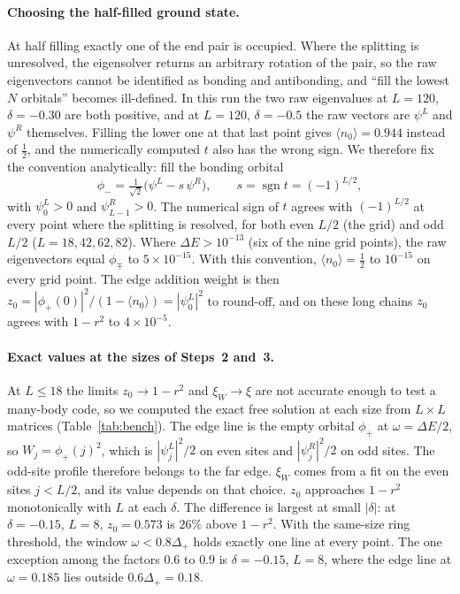 \documentclass[11pt,a4paper]{article}
\begin{document}
\paragraph{Choosing the half-filled ground state.}
At half filling exactly one of the end pair is occupied.
Where the splitting is unresolved, the eigensolver returns an arbitrary rotation of the pair, so the raw eigenvectors cannot be identified as bonding and antibonding, and ``fill the lowest $N$ orbitals'' becomes ill-defined.
In this run the two raw eigenvalues at $L=120$, $\delta=-0.30$ are both positive, and at $L=120$, $\delta=-0.5$ the raw vectors are $\psi^L$ and $\psi^R$ themselves.
Filling the lower one at that last point gives $\langle n_0\rangle = 0.944$ instead of $\tfrac12$, and the numerically computed $t$ also has the wrong sign.
We therefore fix the convention analytically: fill the bonding orbital
\begin{equation}
  \phi_- = \tfrac{1}{\sqrt2}\big(\psi^L - s\,\psi^R\big),\qquad s = \operatorname{sgn}t = (-1)^{L/2},
  \label{eq:convention}
\end{equation}
with $\psi^L_0>0$ and $\psi^R_{L-1}>0$.
The numerical sign of $t$ agrees with $(-1)^{L/2}$ at every point where the splitting is resolved, for both even $L/2$ (the grid) and odd $L/2$ ($L=18,42,62,82$).
Where $\Delta E>10^{-13}$ (six of the nine grid points), the raw eigenvectors equal $\phi_\mp$ to $5\times10^{-15}$.
With this convention, $\langle n_0\rangle = \tfrac12$ to $10^{-15}$ on every grid point.
The edge addition weight is then $z_0 = |\phi_+(0)|^2/(1-\langle n_0\rangle) = |\psi^L_0|^2$ to round-off, and on these long chains $z_0$ agrees with $1-r^2$ to $4\times10^{-5}$.

\paragraph{Exact values at the sizes of Steps~2 and~3.}
At $L\le18$ the limits $z_0\to1-r^2$ and $\xi_W\to\xi$ are not accurate enough to test a many-body code, so we computed the exact free solution at each size from $L\times L$ matrices (Table~\ref{tab:bench}).
The edge line is the empty orbital $\phi_+$ at $\omega=\Delta E/2$, so $W_j=\phi_+(j)^2$, which is $|\psi^L_j|^2/2$ on even sites and $|\psi^R_j|^2/2$ on odd sites.
The odd-site profile therefore belongs to the far edge.
$\xi_W$ comes from a fit on the even sites $j<L/2$, and its value depends on that choice.
$z_0$ approaches $1-r^2$ monotonically with $L$ at each $\delta$.
The difference is largest at small $|\delta|$: at $\delta=-0.15$, $L=8$, $z_0=0.573$ is $26\%$ above $1-r^2$.
With the same-size ring threshold, the window $\omega<0.8\Delta_+$ holds exactly one line at every point.
The one exception among the factors $0.6$ to $0.9$ is $\delta=-0.15$, $L=8$, where the edge line at $\omega=0.185$ lies outside $0.6\Delta_+=0.18$.
\end{document}
